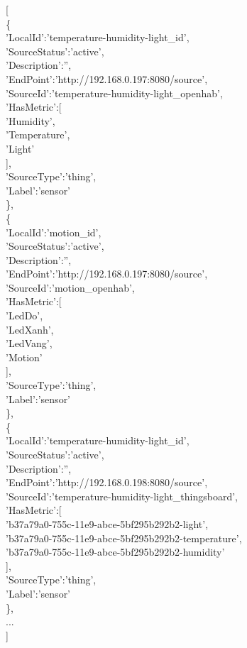 [\\
\blank{1cm}\{\\
\blank{2cm}'LocalId':'temperature-humidity-light\_id',\\
\blank{2cm}'SourceStatus':'active',\\
\blank{2cm}'Description':'',\\
\blank{2cm}'EndPoint':'http://192.168.0.197:8080/source',\\
\blank{2cm}'SourceId':'temperature-humidity-light\_openhab',\\
\blank{2cm}'HasMetric':[\\
\blank{3cm}'Humidity',\\
\blank{3cm}'Temperature',\\
\blank{3cm}'Light'\\
\blank{2cm}],\\
\blank{2cm}'SourceType':'thing',\\
\blank{2cm}'Label':'sensor'\\
\blank{1cm}\},\\
\blank{1cm}\{\\
\blank{2cm}'LocalId':'motion\_id',\\
\blank{2cm}'SourceStatus':'active',\\
\blank{2cm}'Description':'',\\
\blank{2cm}'EndPoint':'http://192.168.0.197:8080/source',\\
\blank{2cm}'SourceId':'motion\_openhab',\\
\blank{2cm}'HasMetric':[\\
\blank{3cm}'LedDo',\\
\blank{3cm}'LedXanh',\\
\blank{3cm}'LedVang',\\
\blank{3cm}'Motion'\\
\blank{2cm}],\\
\blank{2cm}'SourceType':'thing',\\
\blank{2cm}'Label':'sensor'\\
\blank{1cm}\},\\
\blank{1cm}\{\\
\blank{2cm}'LocalId':'temperature-humidity-light\_id',\\
\blank{2cm}'SourceStatus':'active',\\
\blank{2cm}'Description':'',\\
\blank{2cm}'EndPoint':'http://192.168.0.198:8080/source',\\
\blank{2cm}'SourceId':'temperature-humidity-light\_thingsboard',\\
\blank{2cm}'HasMetric':[\\
\blank{2cm}'b37a79a0-755c-11e9-abce-5bf295b292b2-light',\\
\blank{2cm}'b37a79a0-755c-11e9-abce-5bf295b292b2-temperature',\\
\blank{2cm}'b37a79a0-755c-11e9-abce-5bf295b292b2-humidity'\\
\blank{2cm}],\\
\blank{2cm}'SourceType':'thing',\\
\blank{2cm}'Label':'sensor'\\
\blank{1cm}\},\\
\blank{2cm}...\\
]
\clearpage

